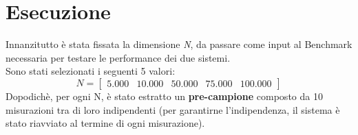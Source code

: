 \section{Esecuzione}
Innanzitutto è stata fissata la dimensione \textit{N}, da passare come input al Benchmark necessaria per testare le performance dei due sistemi.
\\
Sono stati selezionati i seguenti 5 valori:
\begin{equation*}
	N = \begin{bmatrix}
		5.000 & 10.000 & 50.000 & 75.000 & 100.000
	\end{bmatrix}
\end{equation*}
Dopodichè, per ogni N, è stato estratto un \textbf{pre-campione} composto da 10 misurazioni tra di loro indipendenti (per garantirne l'indipendenza, il sistema è stato riavviato al termine di ogni misurazione).
